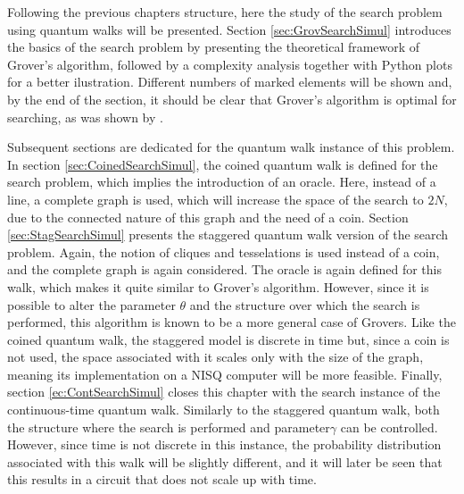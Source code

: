 \documentclass[../../dissertation.tex]{subfiles}
\begin{document}
Following the previous chapters structure, here the study of the search problem
using quantum walks will be presented. Section \ref{sec:GrovSearchSimul}
introduces the basics of the search problem by presenting the theoretical
framework of Grover's algorithm, followed by a complexity analysis together
with Python plots for a better ilustration. Different numbers of marked
elements will be shown and, by the end of the section, it should be clear that
Grover's algorithm is optimal for searching, as was shown by \cite{zalka1999}.\par

Subsequent sections are dedicated for the quantum walk instance of this
problem. In section \ref{sec:CoinedSearchSimul}, the coined quantum
walk is defined for the search problem, which implies the introduction of an
oracle. Here, instead of a line, a complete graph is used, which will
increase the space of the search to $2N$, due to the connected nature of this
graph and the need of a coin. Section \ref{sec:StagSearchSimul} presents the
staggered quantum walk version of the search problem. Again, the notion of
cliques and tesselations is used instead of a coin, and the complete graph is
again considered. The oracle is again defined for this walk, which makes it
quite similar to Grover's algorithm. However, since it is possible to alter the
parameter $\theta$ and the structure over which the search is performed, this
algorithm is known to be a more general case of Grovers. Like the coined
quantum walk, the staggered model is discrete in time but, since a coin is not used,
the space associated with it scales only with the size of the graph, meaning
its implementation on a NISQ computer will be more feasible. Finally, section
\ref{ec:ContSearchSimul} closes this chapter with the search instance of the
continuous-time quantum walk. Similarly to the staggered quantum walk, both the
structure where the search is performed and parameter$\gamma$ can be
controlled. However, since time is not discrete in this instance, the
probability distribution associated with this walk will be slightly different,
and it will later be seen that this results in a circuit that does not scale up
with time.  
\end{document}
